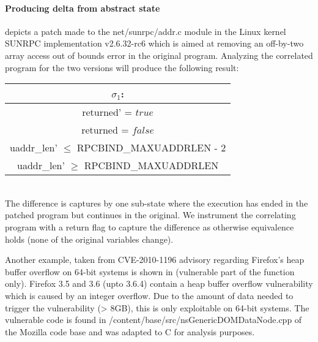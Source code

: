 \paragraph{Producing delta from abstract state}



 depicts a patch made to the net/sunrpc/addr.c module in the Linux kernel SUNRPC implementation v2.6.32-rc6 which is aimed at removing an off-by-two array access out of bounds error in the original program.  Analyzing the correlated program for the two versions will produce the following result: 
\\
\begin{tabular}{c}
$\sigma_1$:
\\ \hline
returned' = $true$
\\
returned = $false$
\\
uaddr\_len' $\leq$ RPCBIND\_MAXUADDRLEN - 2
\\
uaddr\_len' $\geq$ RPCBIND\_MAXUADDRLEN
\\ \hline
\end{tabular}
\\
The difference is captures by one sub-state where the execution has ended in the patched program but continues in the original. We instrument the correlating program with a return flag to capture the difference as otherwise equivalence holds (none of the original variables change).

Another example, taken from CVE-2010-1196 advisory regarding Firefox's heap buffer overflow on 64-bit systems is shown in  (vulnerable part of the function only). Firefox 3.5 and 3.6 (upto 3.6.4) contain a heap buffer overflow vulnerability which is caused by an integer overflow. Due to the amount of data needed to trigger the vulnerability (> 8GB), this is only exploitable on 64-bit systems. The vulnerable code is found in /content/base/src/nsGenericDOMDataNode.cpp
of the Mozilla code base and was adapted to C for analysis purposes.



